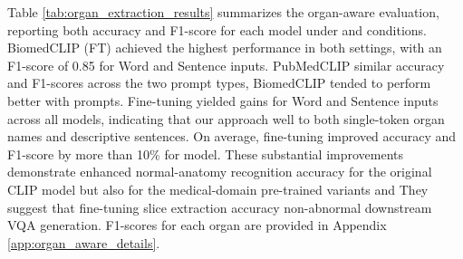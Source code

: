\documentclass[bioengineering,article,submit,pdftex,moreauthors]{Definitions/mdpi}
\begin{document}
Table \ref{tab:organ_extraction_results} summarizes the organ-aware evaluation, reporting both accuracy and F1-score for each model under  and  conditions. 
BiomedCLIP (FT) achieved the highest performance in both settings, with an F1-score of 0.85 for Word and Sentence inputs. 
PubMedCLIP  similar accuracy and F1-scores across the two prompt types,  BiomedCLIP tended to perform better with  prompts. 
Fine-tuning yielded  gains for Word and Sentence inputs across all models, indicating that our approach  well to both single-token organ names and  descriptive sentences. 
On average, fine-tuning improved accuracy and F1-score by more than 10\% for  model. 
These substantial improvements demonstrate enhanced normal-anatomy recognition accuracy for the original CLIP model but also for the medical-domain pre-trained variants  and  
They suggest that fine-tuning  slice extraction accuracy  non-abnormal    downstream VQA generation.
F1-scores for each organ are provided in Appendix \ref{app:organ_aware_details}.
\end{document}
